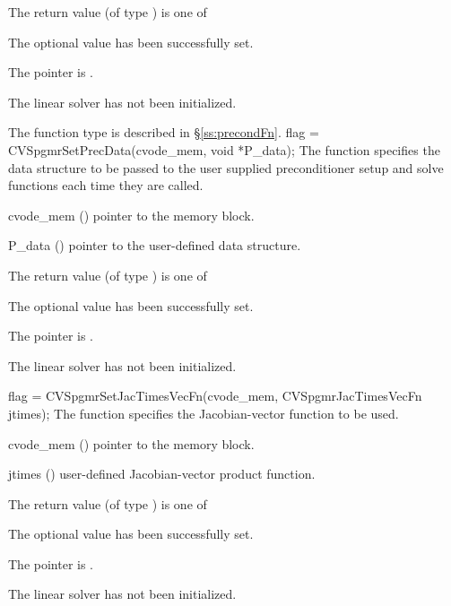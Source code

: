 {
  The return value  (of type ) is one of
  \begin{args}
  \item[\Id{CVSPGMR\_SUCCESS}] 
    The optional value has been successfully set.
  \item[\Id{CVSPGMR\_MEM\_NULL}]
    The  pointer is .
  \item[\Id{CVSPGMR\_LMEM\_NULL}]
    The {\cvspgmr} linear solver has not been initialized.
  \end{args}
}
{
   The function type  is described in \S\ref{ss:precondFn}.
}
{
  flag = CVSpgmrSetPrecData(cvode\_mem, void *P\_data);
}
{
  The function  specifies the data structure
  to be passed to the user supplied preconditioner setup and solve
  functions each time they are called.
}
{
  \begin{args}
  \item[cvode\_mem] ()
    pointer to the {\cvode} memory block.
  \item[P\_data] ()
     pointer to the user-defined data structure.
  \end{args}
}
{
  The return value  (of type ) is one of
  \begin{args}
  \item[\Id{CVSPGMR\_SUCCESS}] 
    The optional value has been successfully set.
  \item[\Id{CVSPGMR\_MEM\_NULL}]
    The  pointer is .
  \item[\Id{CVSPGMR\_LMEM\_NULL}]
    The {\cvspgmr} linear solver has not been initialized.
  \end{args}
}
{}
{
  flag = CVSpgmrSetJacTimesVecFn(cvode\_mem, CVSpgmrJacTimesVecFn jtimes);
}
{
  The function  specifies the Jacobian-vector 
  function to be used.
}
{
  \begin{args}
  \item[cvode\_mem] ()
    pointer to the {\cvode} memory block.
  \item[jtimes] ()
    user-defined Jacobian-vector product function.
  \end{args}
}
{
  The return value  (of type ) is one of
  \begin{args}
  \item[\Id{CVSPGMR\_SUCCESS}] 
    The optional value has been successfully set.
  \item[\Id{CVSPGMR\_MEM\_NULL}]
    The  pointer is .
  \item[\Id{CVSPGMR\_LMEM\_NULL}]
    The {\cvspgmr} linear solver has not been initialized.
  \end{args}
}
